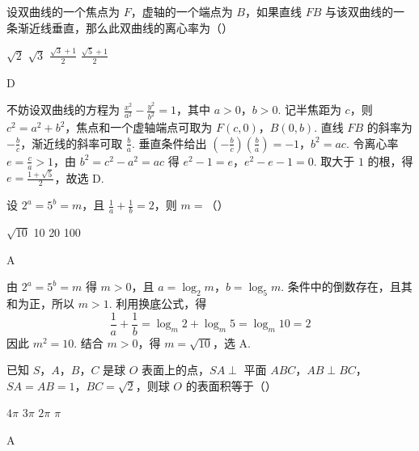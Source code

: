 \begin{problem}
设双曲线的一个焦点为 \(F\)，虚轴的一个端点为 \(B\)，如果直线 \(FB\) 与该双曲线的一条渐近线垂直，那么此双曲线的离心率为（\quad）

\choices
    {\(\sqrt{2}\)}
    {\(\sqrt{3}\)}
    {\(\frac{\sqrt{3}+1}{2}\)}
    {\(\frac{\sqrt{5}+1}{2}\)}
\end{problem}

\begin{answer}
D
\end{answer}

\begin{solution}
不妨设双曲线的方程为 \(\frac{x^2}{a^2}-\frac{y^2}{b^2}=1\)，其中 \(a>0\)，\(b>0\). 记半焦距为 \(c\)，则 \(c^2=a^2+b^2\)，焦点和一个虚轴端点可取为 \(F(c,0)\)，\(B(0,b)\). 直线 \(FB\) 的斜率为 \(-\frac{b}{c}\)，渐近线的斜率可取 \(\frac{b}{a}\). 垂直条件给出
\(\left(-\frac{b}{c}\right)\left(\frac{b}{a}\right)=-1\)，\(b^2=ac\).
令离心率 \(e=\frac{c}{a}>1\)，由 \(b^2=c^2-a^2=ac\) 得
\(e^2-1=e\)，\(e^2-e-1=0\).
取大于 \(1\) 的根，得 \(e=\frac{1+\sqrt{5}}{2}\)，故选 D.
\end{solution}

\begin{problem}
设 \(2^a=5^b=m\)，且 \(\frac{1}{a}+\frac{1}{b}=2\)，则 \(m=\)（\quad）

\choices
    {\(\sqrt{10}\)}
    {10}
    {20}
    {100}
\end{problem}

\begin{answer}
A
\end{answer}

\begin{solution}
由 \(2^a=5^b=m\) 得 \(m>0\)，且 \(a=\log_2m\)，\(b=\log_5m\). 条件中的倒数存在，且其和为正，所以 \(m>1\). 利用换底公式，得
\[
\frac{1}{a}+\frac{1}{b}=\log_m2+\log_m5=\log_m10=2
\]
因此 \(m^2=10\). 结合 \(m>0\)，得 \(m=\sqrt{10}\)，选 A.
\end{solution}

\begin{problem}
已知 \(S\)，\(A\)，\(B\)，\(C\) 是球 \(O\) 表面上的点，\(SA\perp\) 平面 \(ABC\)，\(AB\perp BC\)，\(SA=AB=1\)，\(BC=\sqrt{2}\)，则球 \(O\) 的表面积等于（\quad）

\choices
    {\(4\pi\)}
    {\(3\pi\)}
    {\(2\pi\)}
    {\(\pi\)}
\end{problem}

\begin{answer}
A
\end{answer}

